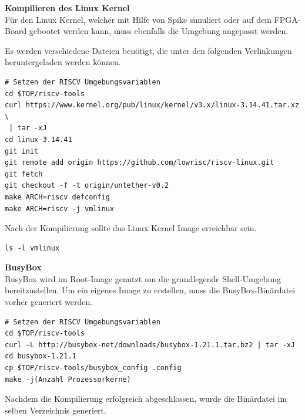 \vspace{5mm}

 \textbf{Kompilieren des Linux Kernel}\\

Für den Linux Kernel, welcher mit Hilfe von Spike simuliert oder auf dem FPGA-Board gebootet werden kann, muss ebenfalls die Umgebung angepasst werden.

Es werden verschiedene Dateien benötigt, die unter den folgenden Verlinkungen heruntergeladen werden können.\\

\begin{lstlisting}[caption={Download und Anpassung des Kernels},label={code:kernelkonf}]
# Setzen der RISCV Umgebungsvariablen
cd $TOP/riscv-tools
curl https://www.kernel.org/pub/linux/kernel/v3.x/linux-3.14.41.tar.xz \
 | tar -xJ
cd linux-3.14.41
git init
git remote add origin https://github.com/lowrisc/riscv-linux.git
git fetch
git checkout -f -t origin/untether-v0.2
make ARCH=riscv defconfig
make ARCH=riscv -j vmlinux
\end{lstlisting}

\vspace{10mm}

Nach der Kompilierung sollte das Linux Kernel Image erreichbar sein.\\

\begin{lstlisting}[caption={Erreichbarkeit des Kernel-Images},label={code:kernelimage}]
ls -l vmlinux
\end{lstlisting}

\newpage
\textbf{BusyBox}\\

BusyBox wird im Root-Image genutzt um die grundlegende Shell-Umgebung bereitzustellen. Um ein eigenes Image zu erstellen, muss die BusyBox-Binärdatei vorher generiert werden.\\

\begin{lstlisting}[caption={Download der BusyBox},label={code:dowbusybox},extendedchars=false]
# Setzen der RISCV Umgebungsvariablen
cd $TOP/riscv-tools
curl -L http://busybox-net/downloads/busybox-1.21.1.tar.bz2 | tar -xJ
cd busybox-1.21.1
cp $TOP/riscv-tools/busybox_config .config
make -j(Anzahl Prozessorkerne)
\end{lstlisting}


Nachdem die Kompilierung erfolgreich abgeschlossen, wurde die Binärdatei im selben Verzeichnis generiert.\\

